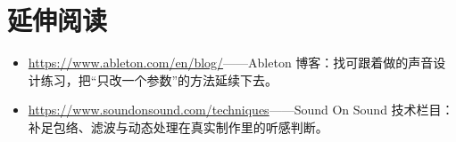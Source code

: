 \section*{延伸阅读}
\begin{itemize}[leftmargin=1.5em]
\item \url{https://www.ableton.com/en/blog/}——Ableton 博客：找可跟着做的声音设计练习，把“只改一个参数”的方法延续下去。
\item \url{https://www.soundonsound.com/techniques}——Sound On Sound 技术栏目：补足包络、滤波与动态处理在真实制作里的听感判断。
\end{itemize}
